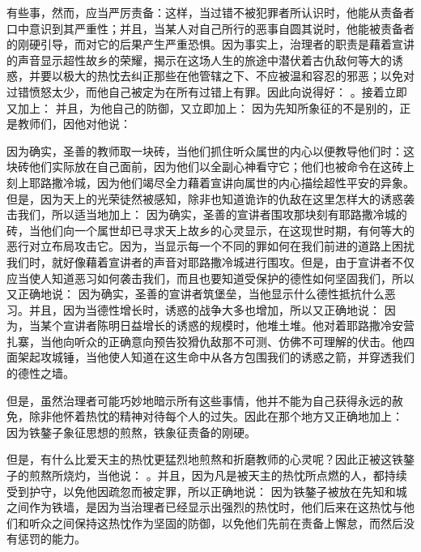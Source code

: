 有些事，然而，应当严厉责备：这样，当过错不被犯罪者所认识时，他能从责备者口中意识到其严重性；并且，当某人对自己所行的恶事自圆其说时，他能被责备者的刚硬引导，而对它的后果产生严重恐惧。因为事实上，治理者的职责是藉着宣讲的声音显示超性故乡的荣耀，揭示在这场人生的旅途中潜伏着古仇敌何等大的诱惑，并要以极大的热忱去纠正那些在他管辖之下、不应被温和容忍的邪恶；以免对过错愤怒太少，而他自己被定为在所有过错上有罪。因此向说得好： 。接着立即又加上： 并且，为他自己的防御，又立即加上： 因为先知所象征的不是别的，正是教师们，因他对他说：\par

因为确实，圣善的教师取一块砖，当他们抓住听众属世的内心以便教导他们时：这块砖他们实际放在自己面前，因为他们以全副心神看守它；他们也被命令在这砖上刻上耶路撒冷城，因为他们竭尽全力藉着宣讲向属世的内心描绘超性平安的异象。但是，因为天上的光荣徒然被感知，除非也知道诡诈的仇敌在这里怎样大的诱惑袭击我们，所以适当地加上： 因为确实，圣善的宣讲者围攻那块刻有耶路撒冷城的砖，当他们向一个属世却已寻求天上故乡的心灵显示，在这现世时期，有何等大的恶行对立布局攻击它。因为，当显示每一个不同的罪如何在我们前进的道路上困扰我们时，就好像藉着宣讲者的声音对耶路撒冷城进行围攻。但是，由于宣讲者不仅应当使人知道恶习如何袭击我们，而且也要知道受保护的德性如何坚固我们，所以又正确地说： 因为确实，圣善的宣讲者筑堡垒，当他显示什么德性抵抗什么恶习。并且，因为当德性增长时，诱惑的战争大多也增加，所以又正确地说： 因为，当某个宣讲者陈明日益增长的诱惑的规模时，他堆土堆。他对着耶路撒冷安营扎寨，当他向听众的正确意向预告狡猾仇敌那不可测、仿佛不可理解的伏击。他四面架起攻城锤，当他使人知道在这生命中从各方包围我们的诱惑之箭，并穿透我们的德性之墙。\par

但是，虽然治理者可能巧妙地暗示所有这些事情，他并不能为自己获得永远的赦免，除非他怀着热忱的精神对待每个人的过失。因此在那个地方又正确地加上： 因为铁鏊子象征思想的煎熬，铁象征责备的刚硬。\par

但是，有什么比爱天主的热忱更猛烈地煎熬和折磨教师的心灵呢？因此正被这铁鏊子的煎熬所烧灼，当他说： 。并且，因为凡是被天主的热忱所点燃的人，都持续受到护守，以免他因疏忽而被定罪，所以正确地说： 因为铁鏊子被放在先知和城之间作为铁墙，是因为当治理者已经显示出强烈的热忱时，他们后来在这热忱与他们和听众之间保持这热忱作为坚固的防御，以免他们先前在责备上懈怠，而然后没有惩罚的能力。\par

